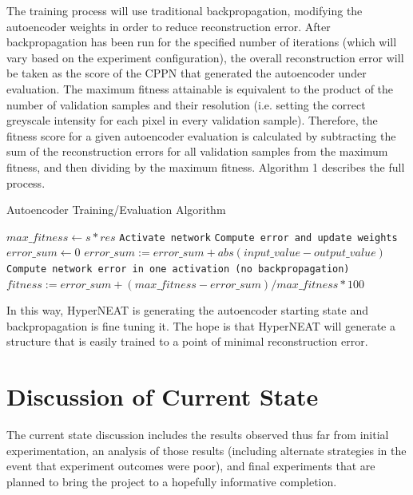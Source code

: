 \documentclass{acm_proc_article-sp}
\begin{document}
The training process will use traditional backpropagation, modifying the autoencoder weights in order to reduce reconstruction error.  After backpropagation has been run for the specified number of iterations (which will vary based on the experiment configuration), the overall reconstruction error will be taken as the score of the CPPN that generated the autoencoder under evaluation.  The maximum fitness attainable is equivalent to the product of the number of validation samples and their resolution (i.e. setting the correct greyscale intensity for each pixel in every validation sample).  Therefore, the fitness score for a given autoencoder evaluation is calculated by subtracting the sum of the reconstruction errors for all validation samples from the maximum fitness, and then dividing by the maximum fitness.  Algorithm 1 describes the full process.

\begin{algorithm*}
	\caption{Autoencoder Training/Evaluation Algorithm}
	\begin{algorithmic}[1]
		 
			\State $max\_fitness \gets s * res$ 
						\State \texttt{Activate network}
						\State \texttt{Compute error and update weights}
					\EndWhile
				\EndFor
				\State $error\_sum\gets 0$ 
						\State $error\_sum := error\_sum + abs(input\_value - output\_value)$ 
					\EndFor
					\State \texttt{Compute network error in one activation (no backpropagation)}
				\EndFor
				\State $fitness := error\_sum + (max\_fitness - error\_sum) / max\_fitness * 100$
      		\EndFor
   		\EndProcedure
	\end{algorithmic}
\end{algorithm*}

In this way, HyperNEAT is generating the autoencoder starting state and backpropagation is fine tuning it.  The hope is that HyperNEAT will generate a structure that is easily trained to a point of minimal reconstruction error.

\section{Discussion of Current State}
The current state discussion includes the results observed thus far from initial experimentation, an analysis of those results (including alternate strategies in the event that experiment outcomes were poor), and final experiments that are planned to bring the project to a hopefully informative completion.
\end{document}
